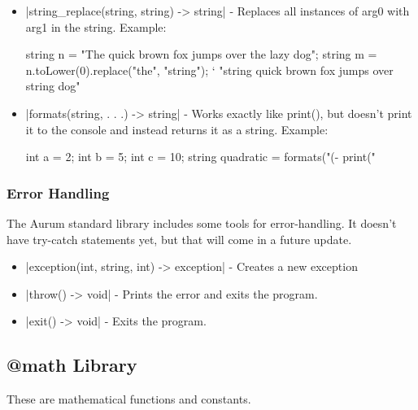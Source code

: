\documentclass[12pt, letterpaper, oneside]{article}
\begin{document}
\begin{itemize}
		\begin{spverbatim}
			string n = "Hello World!";
			string m = n.leftPad(3, 'a'); ` "aaaHello World!"
			string o = n.rightPad(3, 'a'); ` "Hello World!aaa"
		\end{spverbatim}
		\item[--] \spverb|string_replace(string, string) -> string| - Replaces all instances of arg0 with arg1 in the string. Example:
		
		\begin{spverbatim}
			string n = "The quick brown fox jumps over the lazy dog";
			string m = n.toLower(0).replace("the", "string"); ` "string quick brown fox jumps over string dog"
		\end{spverbatim}
		\item[--] \spverb|formats(string, . . .) -> string| - Works exactly like print(), but doesn't print it to the console and instead returns it as a string. \newline Example:
		
		\begin{spverbatim}
			int a = 2;
			int b = 5;
			int c = 10;
			string quadratic = formats("(-%
			print("\n%
		\end{spverbatim}
	\end{itemize}
	\subsubsection{Error Handling}
		The Aurum standard library includes some tools for error-handling. It doesn't have try-catch statements yet, but that will come in a future update.
		\begin{itemize}
			\item[--] \spverb|exception(int, string, int) -> exception| - Creates a new exception
			\item[--] \spverb|throw() -> void| - Prints the error and exits the program.
			\item[--] \spverb|exit() -> void| - Exits the program. 
		\end{itemize}
		\newpage
	\subsection{@math Library}
	These are mathematical functions and constants.
\end{document}
